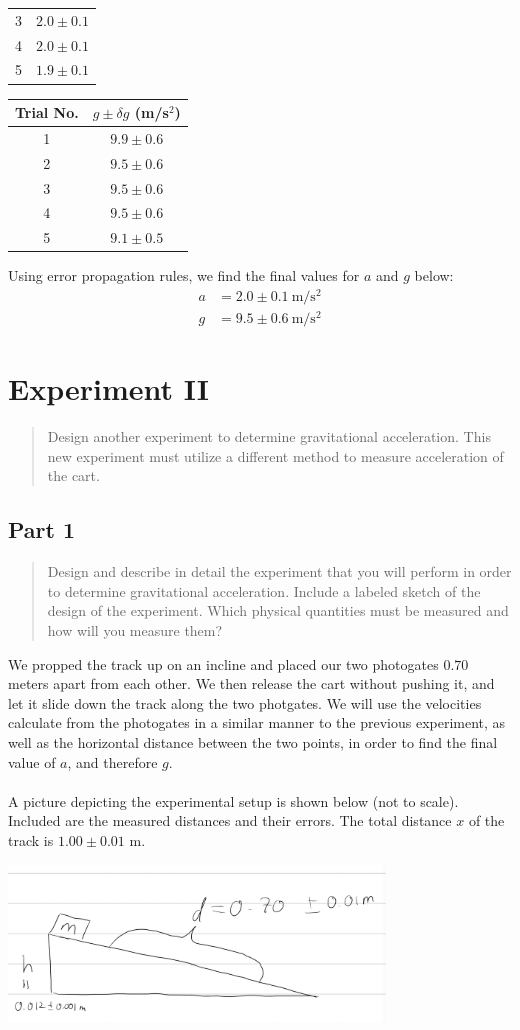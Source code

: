 \documentclass[10pt]{extarticle}
\newcommand{\plain}[1]{\textrm{#1}}
\begin{document}
{\begin{center}
\begin{tabular}{c|c}
		3 & $2.0 \pm 0.1$ \\
		4 & $2.0 \pm 0.1$ \\
		5 & $1.9 \pm 0.1$
	\end{tabular}
	\begin{tabular}{c|c}
		Trial No. & $g \pm \delta g$ (m/s$^2$)\\
		\hline
		1 & $9.9\pm 0.6$ \\
		2 & $9.5 \pm 0.6$ \\
		3 & $9.5 \pm 0.6$ \\
		4 & $9.5\pm 0.6$ \\
		5 & $9.1 \pm 0.5$
	\end{tabular}
\end{center}
Using error propagation rules, we find the final values for $a$ and $g$ below:
\begin{align*}
	a &= 2.0 \pm 0.1~\plain{m/s$^2$} \\
	g &= 9.5 \pm 0.6~\plain{m/s$^{2}$}
\end{align*}
\section*{Experiment II}
\begin{quote}
	Design another experiment to determine gravitational acceleration.  This new experiment must utilize a different method to measure acceleration of the cart.
\end{quote}
\subsection*{Part 1}
\begin{quote}
	Design and describe in detail the experiment that you will perform in order to determine gravitational acceleration.  Include a labeled sketch of the design of the experiment.  Which physical quantities must be measured and how will you measure them?
\end{quote}
We propped the track up on an incline and placed our two photogates $0.70$ meters apart from each other. We then release the cart without pushing it, and let it slide down the track along the two photgates. We will use the velocities calculate from the photogates in a similar manner to the previous experiment, as well as the horizontal distance between the two points, in order to find the final value of $a$, and therefore $g$.\\
\\
A picture depicting the experimental setup is shown below (not to scale). Included are the measured distances and their errors. The total distance $x$ of the track is $1.00 \pm 0.01$ m.
\begin{center}
	\includegraphics[width=10cm]{Lab4Image2_1}
\end{center}
}
\end{document}
